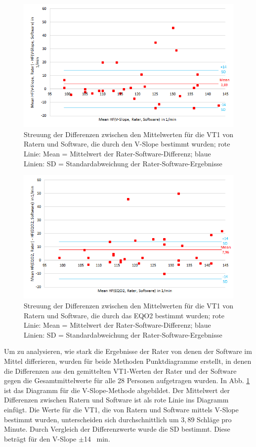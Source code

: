 %
\begin{figure}[H]
	\centering
	\includegraphics[scale=0.7]{Bilder/mean_vslope}
	\caption[Streuung der V-Slope-Ergebnisse zwischen Ratern und Software]{Streuung der Differenzen zwischen den Mittelwerten für die VT1 von Ratern und Software, die durch den V-Slope bestimmt wurden; rote Linie: Mean = Mittelwert der Rater-Software-Differenz; blaue Linien: SD = Standardabweichung der Rater-Software-Ergebnisse}
	\label{pic:pic23}
\end{figure}
%
\begin{figure}[H]
	\centering
	\includegraphics[scale=0.7]{Bilder/mean_eqo2}
	\caption[Streuung der \acs{EQO2}-Ergebnisse zwischen Ratern und Software]{Streuung der Differenzen zwischen den Mittelwerten für die VT1 von Ratern und Software, die durch das \acs{EQO2} bestimmt wurden; rote Linie: Mean = Mittelwert der Rater-Software-Differenz; blaue Linien: SD = Standardabweichung der Rater-Software-Ergebnisse}
	\label{pic:pic24}
\end{figure}
%
Um zu analysieren, wie stark die Ergebnisse der Rater von denen der Software im Mittel differieren, wurden für beide Methoden Punktdiagramme erstellt, in denen die Differenzen aus den gemittelten VT1-Werten der Rater und der Software gegen die Gesamtmittelwerte für alle 28 Personen aufgetragen wurden. In Abb. \ref{pic:pic23} ist das Diagramm für die V-Slope-Methode abgebildet. Der Mittelwert der Differenzen zwischen Ratern und Software ist als rote Linie ins Diagramm einfügt. Die Werte für die VT1, die von Ratern und Software mittels V-Slope bestimmt wurden, unterscheiden sich durchschnittlich um $3,89$ Schläge pro Minute. Durch Vergleich der Differenzwerte wurde die \ac{SD} bestimmt. Diese beträgt für den V-Slope $\pm$14 \si{\per\minute}.\\

